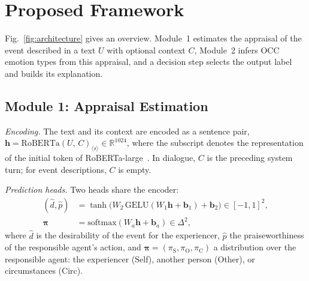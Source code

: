 \documentclass[conference, a4paper]{IEEEtran}
\begin{document}
\section{Proposed Framework}
\label{sec:framework}
Fig.~\ref{fig:architecture} gives an overview. Module~1 estimates the appraisal of the event described in a text $U$ with optional context $C$, Module~2 infers OCC emotion types from this appraisal, and a decision step selects the output label and builds its explanation.

\subsection{Module 1: Appraisal Estimation}
\label{sec:module1}
\textit{Encoding.} The text and its context are encoded as a sentence pair, $\mathbf{h} = \mathrm{RoBERTa}(U,\, C)_{\langle s \rangle} \in \mathbb{R}^{1024}$, where the subscript denotes the representation of the initial token of RoBERTa-large~\cite{liu2019roberta}. In dialogue, $C$ is the preceding system turn; for event descriptions, $C$ is empty.

\textit{Prediction heads.} Two heads share the encoder:
\begin{align}
    (\hat d, \hat p) &= \tanh\!\big(W_2\, \mathrm{GELU}(W_1 \mathbf{h} + \mathbf{b}_1) + \mathbf{b}_2\big) \in [-1,1]^2, \\
    \boldsymbol{\pi} &= \mathrm{softmax}(W_a \mathbf{h} + \mathbf{b}_a) \in \Delta^2,
\end{align}
where $\hat d$ is the desirability of the event for the experiencer, $\hat p$ the praiseworthiness of the responsible agent's action, and $\boldsymbol{\pi} = (\pi_{\mathrm{S}}, \pi_{\mathrm{O}}, \pi_{\mathrm{C}})$ a distribution over the responsible agent: the experiencer (Self), another person (Other), or circumstances (Circ).
\end{document}
